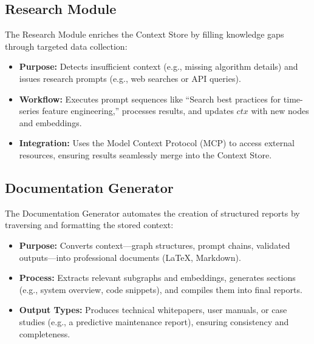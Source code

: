 \documentclass[11pt]{article}
\begin{document}
\subsection{Research Module}
\label{subsec:research_module}

The Research Module enriches the Context Store by filling knowledge gaps through targeted data collection:

\begin{itemize}
  \item \textbf{Purpose:} Detects insufficient context (e.g., missing algorithm details) and issues research prompts (e.g., web searches or API queries).
  \item \textbf{Workflow:} Executes prompt sequences like “Search best practices for time-series feature engineering,” processes results, and updates \(ctx\) with new nodes and embeddings.
  \item \textbf{Integration:} Uses the Model Context Protocol (MCP) to access external resources, ensuring results seamlessly merge into the Context Store.
\end{itemize}

\subsection{Documentation Generator}
\label{subsec:documentation_generator}

The Documentation Generator automates the creation of structured reports by traversing and formatting the stored context:

\begin{itemize}
  \item \textbf{Purpose:} Converts context—graph structures, prompt chains, validated outputs—into professional documents (LaTeX, Markdown).
  \item \textbf{Process:} Extracts relevant subgraphs and embeddings, generates sections (e.g., system overview, code snippets), and compiles them into final reports.
  \item \textbf{Output Types:} Produces technical whitepapers, user manuals, or case studies (e.g., a predictive maintenance report), ensuring consistency and completeness.
\end{itemize}
\end{document}

